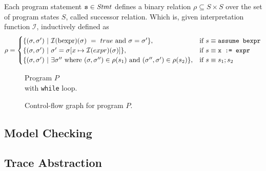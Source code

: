 \begin{mydef}
	Each program statement $\texttt{s} \in \mathit{Stmt}$ defines a binary relation $\rho \subseteq S \times S$ over the set of program states $S$, called successor relation. Which is, given interpretation function $\mathcal{I}$, inductively defined as
	$$ \rho =
	\begin{cases}
		\{(\sigma, \sigma')\ |\ \mathcal{I}(\text{bexpr})(\sigma)\ =\ true\ \text{and}\ \sigma = \sigma'\} ,                                        & \text{if}\ s \equiv \text{\texttt{assume bexpr}} \\
		\{(\sigma, \sigma')\ |\ \sigma' = \sigma[x \mapsto \mathcal{I}(expr)(\sigma)]\} ,                                                           & \text{if}\ s \equiv \texttt{x := expr}           \\
		\{(\sigma, \sigma')\ |\ \exists \sigma''\ \text{where}\ (\sigma, \sigma'') \in \rho(s_1)\ \text{and}\ (\sigma'', \sigma') \in \rho(s_2) \}, & \text{if}\ s \equiv \texttt{$s_1;s_2$}
	\end{cases}
	$$
\end{mydef}
\begin{mydef}
\end{mydef}
\begin{center}
	\begin{minipage}[b]{0.4\linewidth}
			\begin{figure}[H]
			\centering
			
			\caption{Program $P$ \\ with \texttt{while} loop.}
			\label{code}
		\end{figure}
	\end{minipage}
	\hfill
	\begin{minipage}[b]{0.59\linewidth}
		\begin{figure}[H]
			\centering
			
			\caption{Control-flow graph for program $P$.}
			\label{code}
		\end{figure}
	\end{minipage}
\end{center}


\subsection{Model Checking}


\subsection{Trace Abstraction}